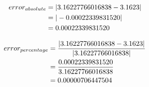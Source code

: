 		\begin{align}
			error_{absolute} &= |3.16227766016838 - 3.1623|& \notag \\
			&= |-0.00022339831520|& \notag \\
			&= 0.00022339831520&
			\label{eq:qfourabs}
		\end{align}

		\begin{align}
			error_{percentage} &= \frac{|3.16227766016838 - 3.1623|}{|3.16227766016838|}& \notag \\
			&= \frac{0.00022339831520}{3.16227766016838}& \notag \\
			&= 0.00000706447504&
			\label{eq:qfourper}
		\end{align}
